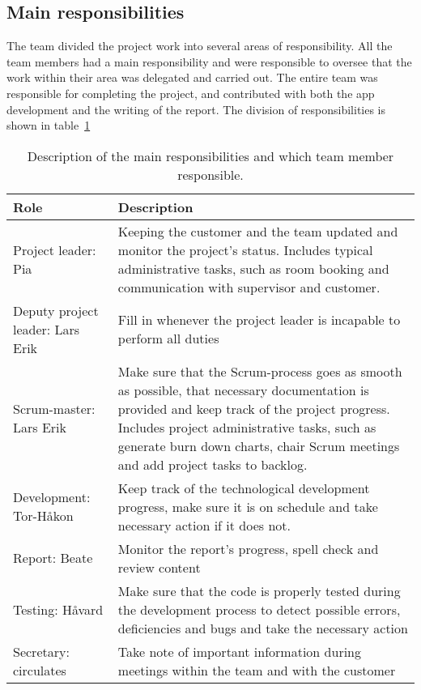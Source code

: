 \newpage
\subsection{Main responsibilities}

The team divided the project work into several areas of responsibility. All the team members had a main responsibility and were responsible to oversee that the work within their area was delegated and carried out. The entire team was responsible for completing the project, and contributed with both the app development and the writing of the report. The division of responsibilities is shown in table~\ref{tab:mainResponsibilities}


\begin{table}[H]
\centering
{}
\begin{tabular}{|l|p{9.7cm}|}
\hline
\textbf{Role} & \textbf{Description}\\\hline
Project leader: Pia & Keeping the customer and the team updated and monitor the project's status. Includes typical administrative tasks, such as room booking and communication with supervisor and customer.\\\hline
Deputy project leader: Lars Erik & Fill in whenever the project leader is incapable to perform all duties\\\hline
Scrum-master: Lars Erik & Make sure that the Scrum-process goes as smooth as possible, that necessary documentation is provided and keep track of the project progress. Includes project administrative tasks, such as generate burn down charts, chair Scrum meetings and add project tasks to backlog.\\\hline
Development: Tor-Håkon & Keep track of the technological development progress, make sure it is on schedule and take necessary action if it does not.\\\hline
Report: Beate & Monitor the report's progress, spell check and review content\\\hline
Testing: Håvard & Make sure that the code is properly tested during the development process to detect possible errors, deficiencies and bugs and take the necessary action \\\hline
Secretary: circulates & Take note of important information during meetings within the team and with the customer\\\hline
\end{tabular}
\caption{Description of the main responsibilities and which team member responsible.}
\label{tab:mainResponsibilities}
\end{table}
